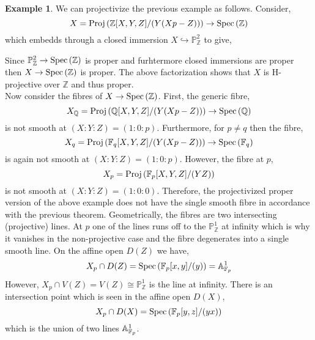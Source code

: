 \documentclass[12pt]{extarticle}
\newcommand{\Z}{\mathbb{Z}}
\theoremstyle{definition}
\newtheorem{example}[theorem]{Example}
\renewcommand{\P}{\mathbb{P}}
\newcommand{\embed}{\hookrightarrow}
\begin{document}
\begin{example}
We can projectivize the previous example as follows. Consider,
\[ X = \Proj{\Z[X, Y, Z] / (Y(X p - Z))} \to \Spec{\Z} \]
which embedds through a closed immersion $X \embed \P_\Z^2$ to give,
\begin{center}
\end{center}
Since $\P^2_\Z \to \Spec{\Z}$ is proper and furhtermore closed immersions are proper then $X \to \Spec{\Z}$ is proper. The above factorization shows that $X$ is H-projective over $\Z$ and thus proper.
\bigskip\\
Now consider the fibres of $X \to \Spec{\Z}$. First, the generic fibre,
\[ X_{\mathbb{Q}} = \mathrm{Proj}\left(\mathbb{Q}[X,Y,Z]/(Y(X p - Z))\right) \to \mathrm{Spec}\left(\mathbb{Q}\right) \]
is not smooth at $(X : Y : Z) = (1 : 0 : p)$. Furthermore, for $p \neq q$ then the fibre,
\[ X_q = \mathrm{Proj}\left(\mathbb{F}_q[X, Y, Z]/(Y(X p - Z))\right) \to \mathrm{Spec}\left(\mathbb{F}_q\right) \]
is again not smooth at $(X : Y : Z) = (1 : 0 : p)$. However, the fibre at $p$,
\[ X_p = \mathrm{Proj}\left(\mathbb{F}_p[X, Y, Z] / (YZ)\right) \]
is not smooth at $(X : Y : Z) = (1 : 0 : 0)$. Therefore, the projectivized proper version of the above example does not have the single smooth fibre in accordance with the previous theorem. Geometrically, the fibres are two intersecting (projective) lines. At $p$ one of the lines runs off to the $\P^1_\Z$ at infinity which is why it vanishes in the non-projective case and the fibre degenerates into a single smooth line. On the affine open $D(Z)$ we have,
\[ X_p \cap D(Z) = \mathrm{Spec}\left(\mathbb{F}_p[x, y]/(y)\right) = \mathbb{A}^1_{\mathbb{F}_p} \]
However, $X_p \cap V(Z) = V(Z) \cong \P^1_\Z$ is the line at infinity. There is an intersection point which is seen in the affine open $D(X)$,
\[ X_p \cap D(X) = \mathrm{Spec}\left(\mathbb{F}_p[y, z]/(yx)\right) \]
which is the union of two lines $\mathbb{A}^1_{\mathbb{F}_p}$. 
\end{example}                                                          
\end{document}
